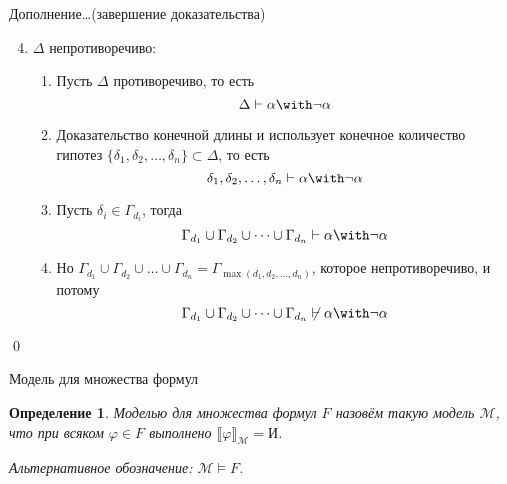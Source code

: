 \documentclass[aspectratio=169]{beamer}
\newtheorem{dfn}{Определение}[section]
\begin{document}
\begin{frame}{Дополнение\dots (завершение доказательства)}\vspace{-1cm}
\begin{block}{}
\begin{enumerate}\setcounter{enumi}{3}
  \item $\Delta$ непротиворечиво:
  \begin{enumerate}
    \item Пусть $\Delta$ противоречиво, то есть $$\Delta \vdash \alpha\with\neg\alpha$$\pause\vspace{-0.2cm}
    \item Доказательство конечной длины и использует конечное количество гипотез $\{\delta_1, \delta_2, \dots, \delta_n\} \subset \Delta$,
          то есть $$\delta_1, \delta_2, \dots, \delta_n \vdash \alpha\with\neg\alpha$$\pause\vspace{-0.2cm}
    \item Пусть $\delta_i \in \Gamma_{d_i}$, тогда $$\Gamma_{d_1}\cup \Gamma_{d_2}\cup \dots\cup \Gamma_{d_n} \vdash \alpha\with\neg\alpha$$\pause\vspace{-0.2cm}
    \item Но $\Gamma_{d_1} \cup \Gamma_{d_2} \cup \dots \cup \Gamma_{d_n} = \Gamma_{\max(d_1,d_2,\dots,d_n)}$,
          которое непротиворечиво, и потому $$\Gamma_{d_1}\cup \Gamma_{d_2}\cup \dots\cup \Gamma_{d_n} \not\vdash \alpha\with\neg\alpha$$
  \end{enumerate}\pause\vspace{-0.5cm}
\end{enumerate}
\qed
\end{block}
\end{frame}

\begin{frame}{Модель для множества формул}
\begin{dfn}Моделью для множества формул $F$ назовём такую модель $\mathcal{M}$, что
    при всяком $\varphi \in F$ выполнено $\llbracket\varphi\rrbracket_\mathcal{M} = \text{И}$.\pause

Альтернативное обозначение: $\mathcal{M}\models F$.
\end{dfn}
\end{frame}
\end{document}
